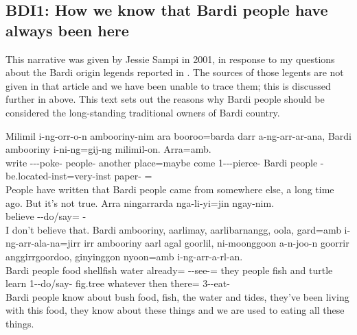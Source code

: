 \subsection{BDI1: How we know that Bardi people have always been here}
This narrative was given by Jessie Sampi in 2001, in response to my questions about the Bardi origin legends reported in \citet{dix96}. The sources of those legents are not given in that article and we have been unable to trace them; this is discussed further in  above. This text sets out the reasons why Bardi people should be considered the long-standing traditional owners of Bardi country.

\newpage\setcounter{exxy}{0}\begin{exye}
\exy {}
\gll Milimil i-ng-orr-o-n ambooriny-nim ara booroo=barda darr a-ng-arr-ar-ana, Bardi ambooriny i-ni-ng=gij-ng milimil-on. Arra=amb.\\
write ---poke- people- another place=maybe come 1---pierce- Bardi people -be.located-inst=very-inst paper- =\\
\ft People have written that Bardi people came from somewhere else, a long time ago. But it's not true.
\exy {}
\gll Arra ningarrarda nga-li-yi=jin ngay-nim.\\
 believe --do/say= -\\
\ft I don't believe that.
\exy {}
\gll Bardi ambooriny, aarlimay, aarlibarnangg, oola, gard=amb i-ng-arr-ala-na=jirr irr ambooriny aarl agal goorlil, ni-moonggoon a-n-joo-n goorrir anggirrgoordoo, ginyinggon nyoon=amb i-ng-arr-a-rl-an.\\
Bardi people food shellfish water already= --see-= they people fish and turtle learn 1--do/say- fig.tree whatever then there= 3--eat-\\
\ft Bardi people know about bush food, fish, the water and tides, they've been living with this food, they know about these things and we are used to eating all these things.

\end{exye}
